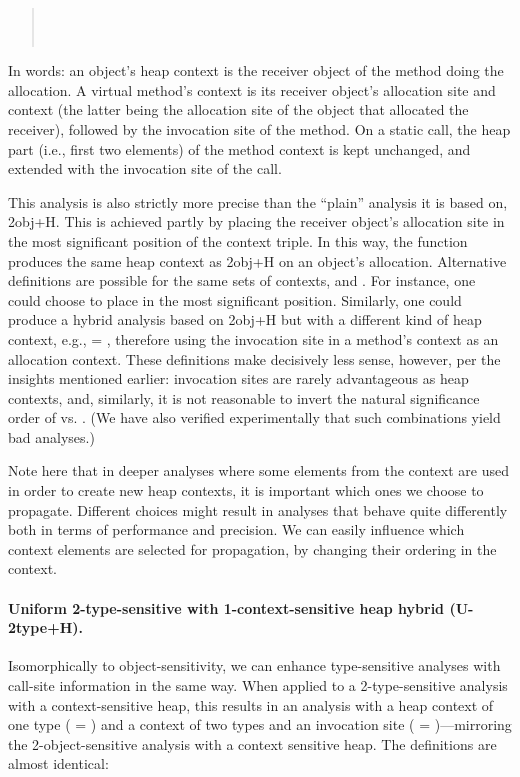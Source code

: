 \begin{quote}
 \\
 \\
\end{quote}

In words: an object's heap context is the receiver object of the method doing the allocation. A virtual method's context is its receiver object's allocation site and context (the latter being the allocation site of the object that allocated the receiver), followed by the invocation site of the method. On a static call, the heap part (i.e., first two elements) of the method context is kept unchanged, and extended with the invocation site of the call.

This analysis is also strictly more precise than the ``plain'' analysis it is based on, 2obj+H. This is achieved partly by placing the receiver object's allocation site in the most significant position of the context triple. In this way, the  function produces the same heap context as 2obj+H on an object's allocation. Alternative definitions are possible for the same sets of contexts,  and . For instance, one could choose to place  in the most significant position. Similarly, one could produce a hybrid analysis based on 2obj+H but with a different kind of heap context, e.g.,  = , therefore using the invocation site in a method's context as an allocation context. These definitions make decisively less sense, however, per the insights mentioned earlier: invocation sites are rarely advantageous as heap contexts, and, similarly, it is not reasonable to invert the natural significance order of  vs. . (We have also verified experimentally that such combinations yield bad analyses.)

Note here that in deeper analyses where some elements from the context are used in order to create new heap contexts, it is important which ones we choose to propagate. Different choices might result in analyses that behave quite differently both in terms of performance and precision. We can easily influence which context elements are selected for propagation, by changing their ordering in the context.

\paragraph[Uniform 2-type-sensitive with 1-context-sensitive heap]{Uniform 2-type-sensitive with 1-context-sensitive heap hybrid (U-2type+H).}
Isomorphically to object-sensitivity, we can enhance type-sensitive analyses with call-site information in the same way. When applied to a 2-type-sensitive analysis with a context-sensitive heap, this results in an analysis with a heap context of one type ( = ) and a context of two types and an invocation site ( = )---mirroring the 2-object-sensitive analysis with a context sensitive heap. The definitions are almost identical:

